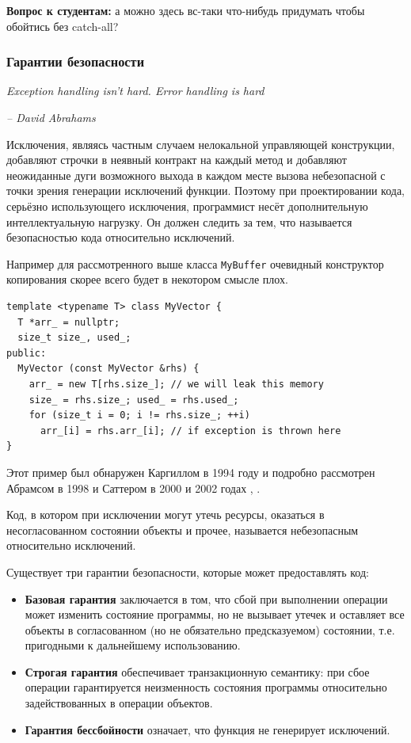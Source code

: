 \documentclass[a4paper,12pt,oneside]{article}
\newif\ifanswers
\begin{document}
\textbf{Вопрос к студентам:} а можно здесь вс-таки что-нибудь придумать чтобы обойтись без catch-all?

\ifanswers
Правильный ответ: да, например завернуть ресурс в RAII-обёртку, чтобы он был автоматически правильно очищен при размотке стека.
\fi

\pagebreak
\subsubsection{Гарантии безопасности}\label{subsub:excsafety}

\hfill\textit{Exception handling isn't hard. Error handling is hard}{\vspace{0.5em}}

\hfill\textit{-- David Abrahams}

Исключения, являясь частным случаем нелокальной управляющей конструкции, добавляют строчки в неявный контракт на каждый метод и добавляют неожиданные дуги возможного выхода в каждом месте вызова небезопасной с точки зрения генерации исключений функции. Поэтому при проектировании кода, серьёзно использующего исключения, программист несёт дополнительную интеллектуальную нагрузку. Он должен следить за тем, что называется безопасностью кода относительно исключений.

Например для рассмотренного выше класса \lstinline!MyBuffer! очевидный конструктор копирования скорее всего будет в некотором смысле плох.

\begin{lstlisting}
template <typename T> class MyVector {
  T *arr_ = nullptr;
  size_t size_, used_;
public:
  MyVector (const MyVector &rhs) {
    arr_ = new T[rhs.size_]; // we will leak this memory
    size_ = rhs.size_; used_ = rhs.used_;
    for (size_t i = 0; i != rhs.size_; ++i)
      arr_[i] = rhs.arr_[i]; // if exception is thrown here
}
\end{lstlisting}

Этот пример был обнаружен Каргиллом в 1994 году \cite{Cargill} и подробно рассмотрен Абрамсом в 1998 \cite{Abrahams} и Саттером в 2000 и 2002 годах \cite{exceptionalcpp}, \cite{moreexceptionalcpp}.

Код, в котором при исключении могут утечь ресурсы, оказаться в несогласованном состоянии объекты и прочее, называется небезопасным относительно исключений. 

Существует три гарантии безопасности, которые может предоставлять код:

\begin{itemize}
\item
\textbf{Базовая гарантия} заключается в том, что сбой при выполнении операции может изменить состояние программы, но не вызывает утечек и оставляет все объекты в согласованном (но не обязательно предсказуемом) состоянии, т.е. пригодными к дальнейшему использованию.
\item
\textbf{Строгая гарантия} обеспечивает транзакционную семантику: при сбое операции гарантируется неизменность состояния программы относительно задействованных в операции объектов.
\item
\textbf{Гарантия бессбойности} означает, что функция не генерирует исключений.
\end{itemize}
\end{document}
